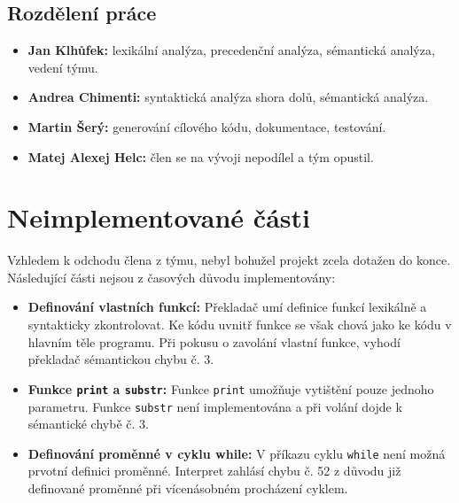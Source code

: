 \documentclass[12pt, a4paper]{article}
\begin{document}
\subsection{Rozdělení práce}
\justifying

\begin{itemize}
    \item \textbf{Jan Klhůfek:} lexikální analýza, precedenční analýza, sémantická analýza, vedení týmu.
    \item \textbf{Andrea Chimenti:} syntaktická analýza shora dolů, sémantická analýza.
    \item \textbf{Martin Šerý:} generování cílového kódu, dokumentace, testování.
    \item \textbf{Matej Alexej Helc:} člen se na vývoji nepodílel a tým opustil.
\end{itemize}

\newpage

\section{Neimplementované části}
\justifying
Vzhledem k odchodu člena z týmu, nebyl bohužel projekt zcela dotažen do konce. Následující části nejsou z časových důvodu implementovány:

\begin{itemize}
    \item \textbf{Definování vlastních funkcí:} Překladač umí definice funkcí lexikálně a syntakticky zkontrolovat. Ke kódu uvnitř funkce se však chová jako ke kódu v hlavním těle programu. Při pokusu o zavolání vlastní funkce, vyhodí překladač sémantickou chybu č. 3.
    \item \textbf{Funkce \texttt{print} a \texttt{substr}:} Funkce \texttt{print} umožňuje vytištění pouze jednoho parametru. Funkce \texttt{substr} není implementována a při volání dojde k sémantické chybě č. 3.
    \item \textbf{Definování proměnné v cyklu while:} V příkazu cyklu \texttt{while} není možná prvotní definici proměnné. Interpret zahlásí chybu č. 52 z důvodu již definované proměnné při vícenásobném procházení cyklem.
\end{itemize}
\end{document}

